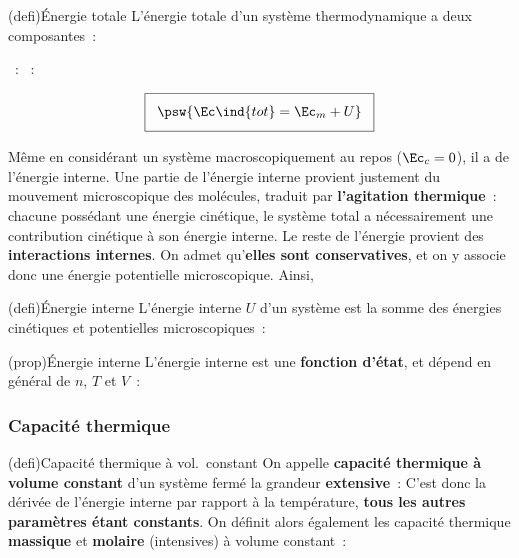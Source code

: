 \documentclass[../../main/main.tex]{subfiles}
\begin{document}
\begin{tcb*}[sidebyside, righthand ratio=.3](defi){Énergie totale}
	L'énergie totale d'un système thermodynamique a deux composantes~:
	\begin{itemize}
		~: 
		~: 
	\end{itemize}
	\vspace{-15pt}
	\tcblower
	\[
		\setlength{\fboxsep}{3mm}
		\boxed{\psw{\Ec\ind{tot} = \Ec_m + U}}
	\]
\end{tcb*}

Même en considérant un système macroscopiquement au repos ($\Ec_c = 0$), il a de
l'énergie interne. Une partie de l'énergie interne provient justement du
mouvement microscopique des molécules, traduit par \textbf{l'agitation
	thermique}~: chacune possédant une énergie cinétique, le système total a
nécessairement une contribution cinétique à son énergie interne.
\bigbreak
Le reste de l'énergie provient des \textbf{interactions internes}. On admet
qu'\textbf{elles sont conservatives}, et on y associe donc une énergie
potentielle microscopique. Ainsi,
\begin{tcb*}(defi){Énergie interne}
	L'énergie interne $U$ d'un système est la somme des énergies cinétiques et
	potentielles microscopiques~:
	\psw{%
	\[
		\boxed{U = e_c + e_p}
		\qav
		e_c = \sum_i e_{c,i} = \sum_i \frac{1}{2}m_i v_i{}^2
	\]
	}%
\end{tcb*}

\begin{tcb*}(prop){Énergie interne}
	L'énergie interne est une \textbf{fonction d'état}, et dépend en général de
	$n$, $T$ et $V$~:
	\psw{%
		\[
			\boxed{U = U (n,T,V)}
		\]
	}%
	\vspace{-15pt}
\end{tcb*}

\subsubsection{Capacité thermique}
\begin{tcb*}[label=defi:cv](defi){Capacité thermique à vol.\ constant}
	On appelle \textbf{capacité thermique à volume constant} d'un système fermé la
	grandeur \textbf{extensive}~:
	\psw{%
		\[
			C_V = \pdv{U}{T}
		\]
	}%
	C'est donc la dérivée de l'énergie interne par rapport à la température,
	\textbf{tous les autres paramètres étant constants}.
	\bigbreak
	On définit alors également les capacité thermique \textbf{massique} et
	\textbf{molaire} (intensives) à volume constant~:
	\psw{%
		\[
			c_V = \frac{C_V}{m}
			\qqet
			C_{V,m} = \frac{C_V}{n}
		\]
	}%
\end{tcb*}
\end{document}
